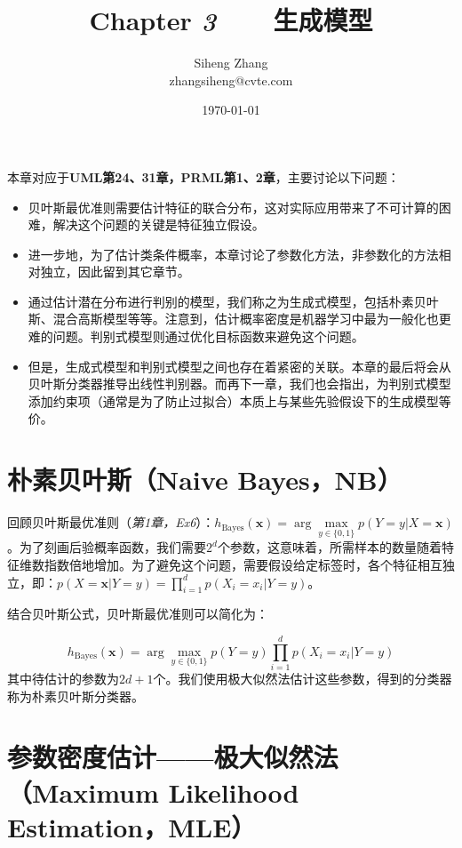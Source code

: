 \documentclass{article}
\author{Siheng Zhang\\zhangsiheng@cvte.com}
\title{Chapter \textbf{\textit{3}}\ \ \ \ 生成模型}
\date{\today}
\begin{document}
\maketitle  

本章对应于\textbf{UML第24、31章，PRML第1、2章}，主要讨论以下问题：

\begin{itemize}
\item 贝叶斯最优准则需要估计特征的联合分布，这对实际应用带来了不可计算的困难，解决这个问题的关键是特征独立假设。
\item 进一步地，为了估计类条件概率，本章讨论了参数化方法，非参数化的方法相对独立，因此留到其它章节。
\item 通过估计潜在分布进行判别的模型，我们称之为生成式模型，包括朴素贝叶斯、混合高斯模型等等。注意到，估计概率密度是机器学习中最为一般化也更难的问题。判别式模型则通过优化目标函数来避免这个问题。
\item 但是，生成式模型和判别式模型之间也存在着紧密的关联。本章的最后将会从贝叶斯分类器推导出线性判别器。而再下一章，我们也会指出，为判别式模型添加约束项（通常是为了防止过拟合）本质上与某些先验假设下的生成模型等价。
\end{itemize}

\tableofcontents
\newpage

\section{朴素贝叶斯（Naive Bayes，NB）}

	回顾贝叶斯最优准则（\textit{第1章，Ex6}）：$	h_{\mathrm{Bayes}}(\bm{x}) = \arg\max\limits_{y\in\{0,1\}} p (Y=y|X=\bm{x})$。为了刻画后验概率函数，我们需要$2^d$个参数，这意味着，所需样本的数量随着特征维数指数倍地增加。为了避免这个问题，需要假设给定标签时，各个特征相互独立，即：$p (X=\bm{x}|Y=y) = \prod_{i=1}^d p (X_i=x_i|Y=y)$。

	结合贝叶斯公式，贝叶斯最优准则可以简化为：
	
	\begin{equation}
	h_{\mathrm{Bayes}}(\bm{x}) = \arg\max\limits_{y\in\{0,1\}} p (Y=y) \prod_{i=1}^d p (X_i=x_i|Y=y)
	\end{equation}
其中待估计的参数为$2d + 1$个。我们使用极大似然法估计这些参数，得到的分类器称为朴素贝叶斯分类器。

\section{参数密度估计——极大似然法（Maximum Likelihood Estimation，MLE）}
	
\end{document}
